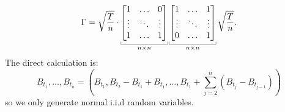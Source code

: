 \documentclass[12pt]{report}
\begin{document}
\begin{equation*}
	\Gamma=\sqrt{\frac{T}{n}}\cdot\ubracketthin{\begin{bmatrix}1&\ldots&0\\
		\vdots&\ddots&\vdots\\
		1&\ldots&1
	\end{bmatrix}}_{n\times n}\ubracketthin{\begin{bmatrix}1&\ldots&1\\
\vdots&\ddots&\vdots\\
0&\ldots&1
\end{bmatrix}}_{n\times n}\sqrt{\frac{T}{n}}.
\end{equation*}
The direct calculation is:
\begin{equation*}
	B_{t_{1}},\ldots,B_{t_{n}}=\left(B_{t_{1}},B_{t_{2}}-B_{t_{1}}+B_{t_{1}},\ldots,B_{t_{1}}+\sum_{j=2}^{n}(B_{t_{j}}-B_{t_{j-1}})\right)
\end{equation*}
so we only generate normal i.i.d random variables.
\end{document}

